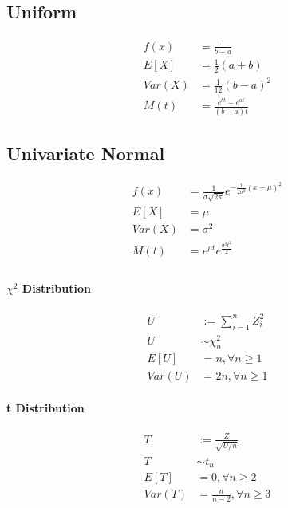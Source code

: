 \begin{minipage}{.07\textwidth}
  \subsection{Uniform}

\begin{align*}
	f(x) &= \frac{1}{b-a} \\
	E[X]&=\frac{1}{2} (a+b) \\
	Var(X)&=\frac{1}{12} (b-a)^2 \\
	M(t)&=\frac{e^{bt} - e^{at}}{(b-a)t}
\end{align*}
\end{minipage}%
\begin{minipage}{.11\textwidth}
  \subsection{Univariate Normal}

\begin{align*}
	f(x) &= \frac{1}{\sigma \sqrt{2\pi}}e^{-\frac{1}{2\sigma^2}(x-\mu)^2 } \\
	E[X]&=\mu \\
	Var(X)&=\sigma^2  \\
	M(t)&=e^{\mu t}e^{\frac{\sigma^2 t^2}{2}} \\
\end{align*}
\end{minipage}

\begin{minipage}{.09\textwidth}
  \paragraph{$\chi^2$ Distribution}

\begin{align*}
	U&:=\sum\limits_{i=1}^{n}Z_i^2 \\
	U& \sim \chi^2_n \\
	E[U]&=n , \forall n \geq 1\\
	Var(U) &= 2n , \forall n \geq 1
\end{align*}
\end{minipage}%
\begin{minipage}{.09\textwidth}
  \paragraph{t Distribution}

\begin{align*}
	T&:= \frac{Z}{\sqrt{U/n}}\\
	T& \sim t_n \\
	E[T]&=0 , \forall n \geq 2\\
	Var(T) &= \frac{n}{n-2} , \forall n \geq 3
\end{align*}
\end{minipage}

